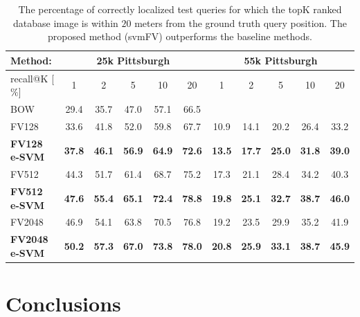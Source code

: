 \documentclass[table]{article} %
\begin{document}
\begin{table}[t!]
\begin{centering}
	\begin{tabularx}{0.94\linewidth}{|l|c c c c c|c c c c c|}
		\hline 
		\rowcolor{maroon!50}
		Method: & \multicolumn{5}{c|}{25k Pittsburgh} & \multicolumn{5}{c|}{55k Pittsburgh} \\
		\hline 
		\hline 
		\rowcolor{maroon!50}
		recall@K [$\%$] & 1 & 2 & 5 & 10 & 20 & 1 & 2 & 5 & 10 & 20\\
		\hline
		\rowcolor{maroon!10}
		BOW & 29.4 & 35.7 & 47.0 & 57.1 & 66.5 &  &  &  &  & \\
        \hline
		\rowcolor{maroon!10}
		FV128         & 33.6 & 41.8 & 52.0 & 59.8 & 67.7 & 10.9 & 14.1 & 20.2 & 26.4 & 33.2 \\
		\rowcolor{maroon!10}
		\textbf{FV128 e-SVM}   & \textbf{37.8}  & \textbf{46.1} & \textbf{56.9} & \textbf{64.9} & \textbf{72.6}  &
                                 \textbf{13.5}  &  \textbf{17.7}  &  \textbf{25.0}  &  \textbf{31.8}  &  \textbf{39.0} \\
        \hline
        \rowcolor{maroon!10}
        FV512         & 44.3 & 51.7 & 61.4 & 68.7 & 75.2 & 17.3 &  21.1 &  28.4 &  34.2 &  40.3 \\
        \rowcolor{maroon!10}
        \textbf{FV512 e-SVM}   & \textbf{47.6}  & \textbf{55.4} & \textbf{65.1} & \textbf{72.4} & \textbf{78.8}  &
                                 \textbf{19.8} &  \textbf{25.1} &  \textbf{32.7}  & \textbf{38.7} &  \textbf{46.0} \\
        \hline
		\rowcolor{maroon!10}
		FV2048        & 46.9  & 54.1 & 63.8 & 70.5 & 76.8 & 19.2 & 23.5 & 29.9 &  35.2 &  41.9 \\
		\rowcolor{maroon!10}
		\textbf{FV2048 e-SVM}  & \textbf{50.2} & \textbf{57.3} & \textbf{67.0} & \textbf{73.8} & \textbf{78.0} &
        \textbf{20.8} & \textbf{25.9} & \textbf{33.1} & \textbf{38.7} & \textbf{45.9}\\
        \hline
	\end{tabularx}
	\caption{ \textcolor{myRed}{}
		The percentage of correctly localized test queries for which the topK ranked database image is within $20$ meters from the ground truth query position. The proposed method (svmFV) outperforms the baseline methods.
		}
	\label{tab:recall}
\end{centering}
\end{table}


\section{Conclusions}





\small{
	
	
	}
\end{document}
